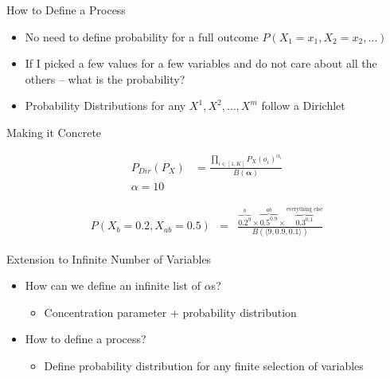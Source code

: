 \documentclass[11pt]{beamer}
\begin{document}
	\begin{frame}{How to Define a Process}
		\begin{itemize}
			\item No need to define probability for a full outcome $P(X_1=x_1,X_2=x_2,\dots)$
			\item If I picked a few values for a few variables and do not care about all the others -- what is the probability?
			\item Probability Distributions for any $X^1,X^2,\dots,X^m$ follow a Dirichlet
		\end{itemize}
	\end{frame}
	
	\begin{frame}{Making it Concrete}
		\centering
		
		
		\begin{align*}
			P_{Dir}(P_X) & = \frac{\prod_{i \in [1,K]} P_{X}(o_i)^{\alpha_i}}{B(\boldsymbol{\alpha})} \\
			\alpha = 10
		\end{align*}
		
		\begin{align*}
		P(X_{b} = 0.2,X_{ab} = 0.5) & = &
		\frac{\overbrace{0.2^{9}}^{b} \times \overbrace{0.5^{0.9}}^{ab} \times
			\overbrace{0.3^{0.1}}^{\text{everything else}}}{B(\langle 9,0.9,0.1 \rangle)}
		\end{align*}
	\end{frame}
	
	\begin{frame}{Extension to Infinite Number of Variables}
		\begin{itemize}
			\item How can we define an infinite list of $\alpha$s?
			\begin{itemize}
				\item Concentration parameter + probability distribution \checkmark
			\end{itemize}
			\item How to define a process?
			\begin{itemize}
				\item Define probability distribution for any finite selection of variables
			\end{itemize}
		\end{itemize}
	\end{frame}
	
\end{document}
